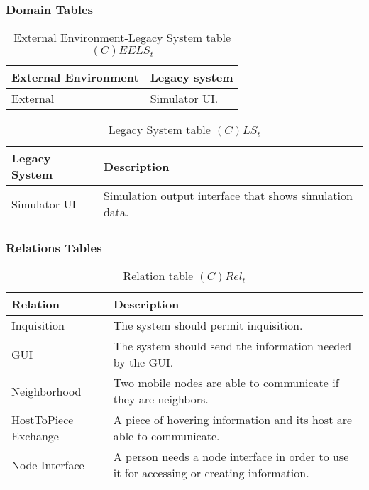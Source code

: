 \subsubsection{Domain Tables}

\begin{table}[H]
	\centering
	\begin{tabular}{|p{4cm}|p{8cm}|}
			\hline
			\textbf{External Environment} & \textbf{Legacy system} \\
			\hline
			External & Simulator UI. \\
			\hline
		\end{tabular}
	\caption{External Environment-Legacy System table $(C)EELS_t$}
	\label{tab:ceelst}
\end{table}

\begin{table}[H]
	\centering
	\begin{tabular}{|p{4cm}|p{8cm}|}
			\hline
			\textbf{Legacy System} & \textbf{Description} \\
			\hline
			Simulator UI & Simulation output interface that shows simulation data. \\
			\hline
		\end{tabular}
	\caption{Legacy System table $(C)LS_t$}
	\label{tab:clst}
\end{table}

\subsubsection{Relations Tables}

\begin{table}[H]
	\centering
	\begin{tabular}{|p{4cm}|p{8cm}|}
			\hline
			\textbf{Relation} & \textbf{Description} \\
			\hline
			Inquisition & The system should permit inquisition. \\
			\hline
			GUI & The system should send the information needed by the GUI. \\
			\hline
			Neighborhood & Two mobile nodes are able to communicate if they are neighbors. \\
			\hline
			HostToPiece Exchange & A piece of hovering information and its host are able to communicate. \\
			\hline
			Node Interface & A person needs a node interface in order to use it for
			accessing or creating information. \\
			\hline
		\end{tabular}
	\caption{Relation table $(C)Rel_t$}
	\label{tab:crelt}
\end{table}


